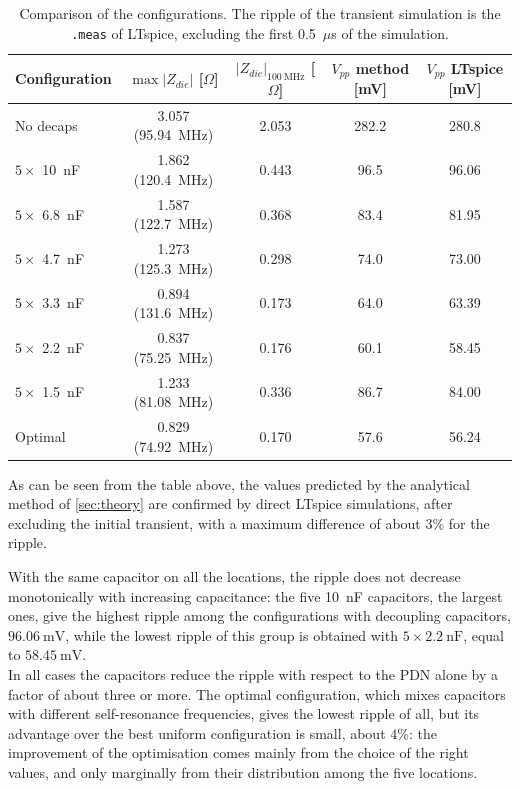 \begin{table}[!h]
\centering
\caption{Comparison of the configurations. The ripple of the transient simulation is the \texttt{.meas} of LTspice, excluding the first 0.5~$\mu$s of the simulation.}
\label{tab:comp_all}
\begin{tabular}{lcccc}
\hline
\textbf{Configuration} & $\max|Z_{die}|$ [$\Omega$] & $|Z_{die}|_{100~\text{MHz}}$ [$\Omega$] & $V_{pp}$ method [mV] & $V_{pp}$ LTspice [mV] \\
\hline
No decaps             & 3.057 (95.94~MHz) & 2.053 & 282.2 & 280.8 \\
$5\times$ 10~nF       & 1.862 (120.4~MHz) & 0.443 & 96.5  & 96.06 \\
$5\times$ 6.8~nF      & 1.587 (122.7~MHz) & 0.368 & 83.4  & 81.95 \\
$5\times$ 4.7~nF      & 1.273 (125.3~MHz) & 0.298 & 74.0  & 73.00 \\
$5\times$ 3.3~nF      & 0.894 (131.6~MHz) & 0.173 & 64.0  & 63.39 \\
$5\times$ 2.2~nF      & 0.837 (75.25~MHz) & 0.176 & 60.1  & 58.45 \\
$5\times$ 1.5~nF      & 1.233 (81.08~MHz) & 0.336 & 86.7  & 84.00 \\
Optimal               & 0.829 (74.92~MHz) & 0.170 & 57.6  & 56.24 \\
\hline
\end{tabular}
\end{table}

\noindent As can be seen from the table above, the values predicted by the analytical method of \autoref{sec:theory} are confirmed
by direct LTspice simulations, after excluding the initial transient, with a maximum difference of about $3\%$ for the ripple.

\noindent With the same capacitor on all the locations, the ripple does not decrease monotonically with increasing capacitance: the five 10~nF capacitors, the largest ones, give the highest ripple among the
configurations with decoupling capacitors, $96.06~\text{mV}$, while the lowest ripple of this group is obtained with $5\times 2.2~\text{nF}$, equal to $58.45~\text{mV}$.
\\ In all cases the capacitors reduce the ripple with respect to the
PDN alone by a factor of about three or more. The optimal configuration, which mixes capacitors with different self-resonance frequencies, gives the lowest ripple of all, but its advantage over the best uniform
configuration is small, about $4\%$: the improvement of the optimisation comes mainly from the choice of the right values, and only marginally from their distribution among the five locations.

